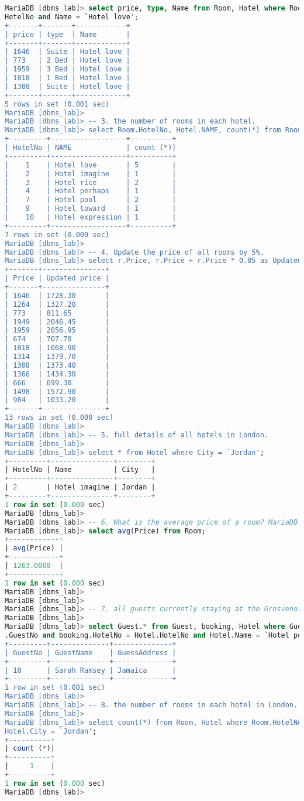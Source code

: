 \documentclass{article}
\begin{document}
\begin{lstlisting}[language=SQL]
MariaDB [dbms_lab]> select price, type, Name from Room, Hotel where Room.HotelNo = Hotel.
HotelNo and Name = `Hotel love'; 
+-------+-------+------------+
| price | type  | Name       | 
+-------+-------+------------+
| 1646  | Suite | Hotel love | 
| 773   | 2 Bed | Hotel love |
| 1959  | 3 Bed | Hotel love |
| 1018  | 1 Bed | Hotel love |
| 1308  | Suite | Hotel love | 
+-------+-------+------------+
5 rows in set (0.001 sec)
MariaDB [dbms_lab]>
MariaDB [dbms_lab]> -- 3. the number of rooms in each hotel.
MariaDB [dbms_lab]> select Room.HotelNo, Hotel.NAME, count(*) from Room, Hotel where Room. HotelNo = Hotel.HotelNo group by HotelNo;
+---------+------------------+----------+ 
| HotelNo | NAME             | count (*)|
+---------+------------------+----------+ 
|    1    | Hotel love       | 5        |
|    2    | Hotel imagine    | 1        |
|    3    | Hotel rice       | 2        |
|    4    | Hotel perhaps    | 1        |
|    7    | Hotel pool       | 2        |
|    9    | Hotel toward     | 1        | 
|    10   | Hotel expression | 1        |
+---------+------------------+----------+ 
7 rows in set (0.000 sec)
MariaDB [dbms_lab]>
MariaDB [dbms_lab]> -- 4. Update the price of all rooms by 5%.
MariaDB [dbms_lab]> select r.Price, r.Price + r.Price * 0.05 as Updated_price from Room r;
+-------+---------------+ 
| Price | Updated_price |
+-------+---------------+
| 1646  | 1728.30       | 
| 1264  | 1327.20       |
| 773   | 811.65        | 
| 1949  | 2046.45       |
| 1959  | 2056.95       | 
| 674   | 707.70        |
| 1018  | 1068.90       | 
| 1314  | 1379.70       |
| 1308  | 1373.40       | 
| 1366  | 1434.30       |
| 666   | 699.30        | 
| 1498  | 1572.90       |
| 984   | 1033.20       | 
+-------+---------------+
13 rows in set (0.000 sec)
MariaDB [dbms_lab]>
MariaDB [dbms_lab]> -- 5. full details of all hotels in London.
MariaDB [dbms_lab]>
MariaDB [dbms_lab]> select * from Hotel where City = `Jordan';
+---------+---------------+--------+ 
| HotelNo | Name          | City   |
+---------+---------------+--------+ 
| 2       | Hotel imagine | Jordan |
+---------+---------------+--------+ 
1 row in set (0.000 sec)
MariaDB [dbms_lab]>
MariaDB [dbms_lab]> -- 6. What is the average price of a room? MariaDB [dbms_lab]>
MariaDB [dbms_lab]> select avg(Price) from Room; 
+------------+
| avg(Price) | 
+------------+
| 1263.0000  |
+------------+
1 row in set (0.000 sec)
MariaDB [dbms_lab]>
MariaDB [dbms_lab]>
MariaDB [dbms_lab]> -- 7. all guests currently staying at the Grosvenor Hotel.
MariaDB [dbms_lab]>
MariaDB [dbms_lab]> select Guest.* from Guest, booking, Hotel where Guest.GuestNo = booking
.GuestNo and booking.HotelNo = Hotel.HotelNo and Hotel.Name = `Hotel pool'; 
+---------+--------------+--------------+
| GuestNo | GuestName    | GuessAddress | 
+---------+--------------+--------------+
| 10      | Sarah Ramsey | Jamaica      | 
+---------+--------------+--------------+
1 row in set (0.001 sec)
MariaDB [dbms_lab]>
MariaDB [dbms_lab]> -- 8. the number of rooms in each hotel in London.
MariaDB [dbms_lab]>
MariaDB [dbms_lab]> select count(*) from Room, Hotel where Room.HotelNo = Hotel.HotelNo and
Hotel.City = `Jordan'; 
+----------+
| count (*)| 
+----------+
|     1    | 
+----------+
1 row in set (0.000 sec)
MariaDB [dbms_lab]>
\end{lstlisting}
\end{document}
